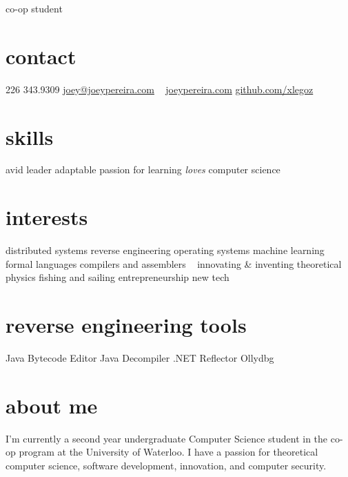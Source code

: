 \documentclass[]{friggeri-cv}
\begin{document}
       {co-op student}


\begin{aside}
  \section{contact}
    226 343.9309
    \href{mailto:joey@joeypereira.com}{joey@joeypereira.com}
    ~
    \href{http://joeypereira.com}{joeypereira.com}
    \href{http://www.github.com/xlegoz}{github.com/xlegoz}
  \section{skills}
  avid leader
  adaptable
  passion for learning
  {\em loves} computer science
  \section{interests}
  	distributed systems
  	reverse engineering
  	operating systems
  	machine learning
  	formal languages
  	compilers and assemblers
  	~
	innovating \& inventing
  	theoretical physics
  	fishing and sailing
  	entrepreneurship
  	new tech
  \section{reverse engineering tools}
  	Java Bytecode Editor
  	Java Decompiler
  	.NET Reflector
  	Ollydbg  	
\end{aside}


\section{about me}
I'm currently a second year undergraduate Computer Science student in the co-op program at the University of Waterloo. I have a passion for theoretical computer science, software development, innovation, and computer security.

\end{document}
